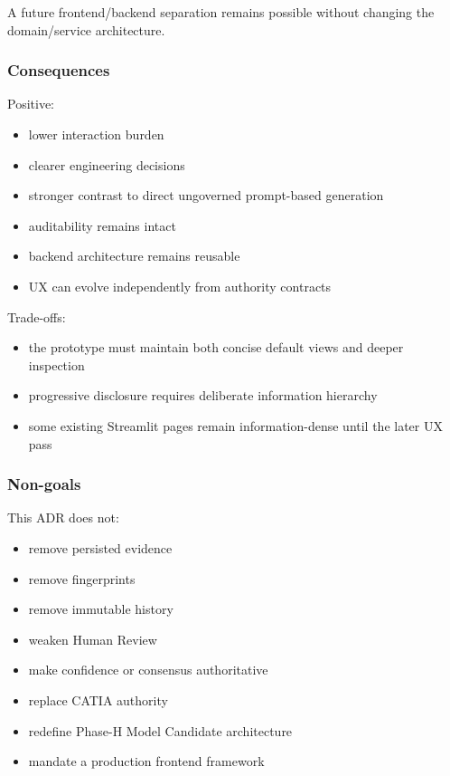 A future frontend/backend separation remains possible without changing the domain/service architecture.

\hypertarget{consequences-2}{%
\subsubsection{Consequences}\label{consequences-2}}

Positive:

\begin{itemize}
\tightlist
\item
  lower interaction burden
\item
  clearer engineering decisions
\item
  stronger contrast to direct ungoverned prompt-based generation
\item
  auditability remains intact
\item
  backend architecture remains reusable
\item
  UX can evolve independently from authority contracts
\end{itemize}

Trade-offs:

\begin{itemize}
\tightlist
\item
  the prototype must maintain both concise default views and deeper inspection
\item
  progressive disclosure requires deliberate information hierarchy
\item
  some existing Streamlit pages remain information-dense until the later UX pass
\end{itemize}

\hypertarget{non-goals}{%
\subsubsection{Non-goals}\label{non-goals}}

This ADR does not:

\begin{itemize}
\tightlist
\item
  remove persisted evidence
\item
  remove fingerprints
\item
  remove immutable history
\item
  weaken Human Review
\item
  make confidence or consensus authoritative
\item
  replace CATIA authority
\item
  redefine Phase-H Model Candidate architecture
\item
  mandate a production frontend framework
\end{itemize}

